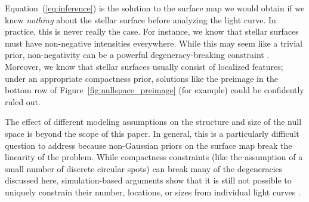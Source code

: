 \documentclass[modern,linenumbers]{aastex62}
\begin{document}

Equation~(\ref{eq:inference}) is the solution to the surface map
we would obtain if we knew \emph{nothing} about the stellar surface
before analyzing the light curve. In practice, this is never really
the case. For instance, we know that stellar surfaces
must have non-negative intensities everywhere. While this may seem
like a trivial prior, non-negativity can be a powerful degeneracy-breaking
constraint \citep[e.g.,][]{Fienup1982}. Moreover, we know that
stellar surfaces usually consist of localized features; under an
appropriate compactness prior, solutions
like the preimage in the bottom row of
Figure~\ref{fig:nullspace_preimage} (for example) could be
confidently ruled out.

The effect of different modeling assumptions on the structure and size of the null
space is beyond the scope of this paper. In general, this is a particularly
difficult question to address because non-Gaussian priors on the
surface map break the linearity of the problem. While compactness constraints
(like the assumption of a small number of discrete circular spots) can
break many of the degeneracies discussed here, simulation-based
arguments show that it is still not possible to uniquely constrain
their number, locations, or sizes from individual light curves
\citep{Basri2020}.

\end{document}
